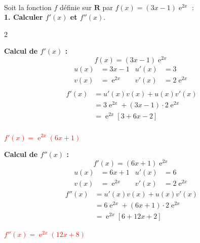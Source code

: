 \documentclass[11pt,a4paper]{article}
\DeclareMathOperator{\e}{e}
\begin{document}
\vfill 
\newpage 


\\
\normalsize
Soit la fonction $f$ définie sur $\mathbf{R}$ par $f(x)=(3x-1)\e^{2x}$ : \\

\textbf{1. Calculer $f'(x)$ et $f''(x).$}

\begin{multicols}{2}
\begin{tcolorbox}[colback=red!5!white,colframe=red!75!black]
{
\textbf{Calcul de $f'(x)$ :}
\[
f(x) = (3x-1)\e^{2x}
\]
\[
\begin{aligned}
u(x) &= 3x-1 & u'(x) &= 3 \\
v(x) &= \e^{2x} & v'(x) &= 2\e^{2x}\\
\end{aligned}
\]
\[
\begin{aligned}
    f'(x) & = u'(x)v(x) + u(x)v'(x)  \\
            & = 3\e^{2x} + (3x-1) \cdot 2\e^{2x} \\
            & = \e^{2x}[3 + 6x - 2] \\
\end{aligned}
\]
\begin{center}
\textbf{\textcolor{red}{$f'(x) = \e^{2x}(6x + 1)$}}
\end{center}
}
\end{tcolorbox}

\begin{tcolorbox}[colback=red!5!white,colframe=red!75!black]
{
\textbf{Calcul de $f''(x)$ :}
\[
f'(x) = (6x+1)\e^{2x}
\]
\[
\begin{aligned}
u(x) &= 6x+1 & u'(x) &= 6 \\
v(x) &= \e^{2x} & v'(x) &= 2\e^{2x}
\end{aligned}
\]
\[
\begin{aligned}
    f''(x) & = u'(x)v(x) + u(x)v'(x)  \\
            & = 6\e^{2x} + (6x+1) \cdot 2\e^{2x} \\
            & = \e^{2x}[6 + 12x + 2] 
\end{aligned}
\]
\begin{center}
\textbf{\textcolor{red}{$f''(x) = \e^{2x}(12x + 8)$}}
\end{center}
}
\end{tcolorbox}
\end{multicols}
\end{document}
